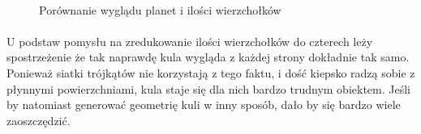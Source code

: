 \begin{figure}
\centering
	   \hspace{.0\textwidth}
	   \hspace{.0\textwidth}
	   \hspace{.0\textwidth} \\
	 \hspace{.0\textwidth} 
\caption{Porównanie wyglądu planet i ilości wierzchołków}
\label{fig:geom}
\end{figure}

\paragraph{}

U podstaw pomysłu na zredukowanie ilości wierzchołków do czterech leży spostrzeżenie że tak naprawdę kula wygląda z każdej strony dokładnie tak samo. Ponieważ siatki trójkątów nie korzystają z tego faktu, i dość kiepsko radzą sobie z płynnymi powierzchniami, kula staje się dla nich bardzo trudnym obiektem. Jeśli by natomiast generować geometrię kuli w inny sposób, dało by się bardzo wiele zaoszczędzić.

